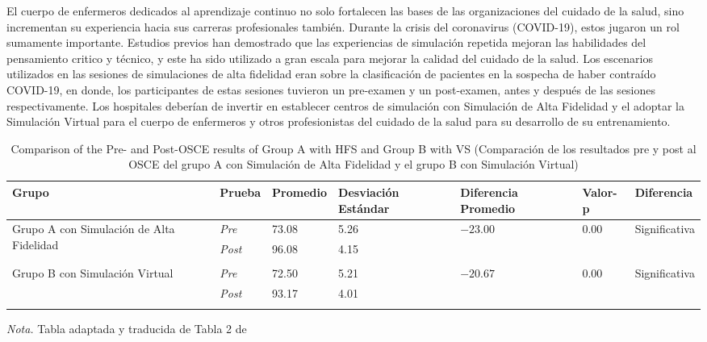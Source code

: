 El cuerpo de enfermeros dedicados al aprendizaje continuo no solo fortalecen las bases de las organizaciones del cuidado de la salud, sino incrementan su experiencia hacia sus carreras profesionales también. Durante la crisis del coronavirus (COVID-19), estos jugaron un rol sumamente importante. Estudios previos han demostrado que las experiencias de simulación repetida mejoran las habilidades del pensamiento critico y técnico, y este ha sido utilizado a gran escala para mejorar la calidad del cuidado de la salud. Los escenarios utilizados en las sesiones de simulaciones de alta fidelidad eran sobre la clasificación de pacientes en la sospecha de haber contraído COVID-19, en donde, los participantes de estas sesiones tuvieron un pre-examen y un post-examen, antes y después de las sesiones respectivamente. Los hospitales deberían de invertir en establecer centros de simulación con Simulación de Alta Fidelidad y el adoptar la Simulación Virtual para el cuerpo de enfermeros y otros profesionistas del cuidado de la salud para su desarrollo de su entrenamiento. \cite{GUERRERO2022100002}
\begin{table}[H]
   \caption{Comparison of the Pre- and Post-OSCE results of Group A with HFS and Group B with VS (Comparación de los resultados pre y post al OSCE del grupo A con Simulación de Alta Fidelidad y el grupo B con Simulación Virtual)}
   \label{tab:tabla-enfermeros}
   \begin{center}
      \begin{tabular}{ p{3cm} p{1cm} p{2cm} p{2cm} p{2cm} p{1cm} p{1cm} }
         \hline
         Grupo & Prueba & Promedio & Desviación Estándar & Diferencia Promedio & Valor-p & Diferencia \\
         \hline
         \multirow{2}{3cm}{Grupo A con Simulación de Alta Fidelidad} & \textit{Pre}  & 73.08 & 5.26 & $-23.00$ & 0.00 & Significativa \\
                                             & \textit{Post} & 96.08 & 4.15 & ~      & ~    & ~            \\
                                             \\
         \multirow{2}{3cm}{Grupo B con Simulación Virtual}  & \textit{Pre}  & 72.50 & 5.21 & $-20.67$ & 0.00 & Significativa \\
                                             & \textit{Post} & 93.17 & 4.01 \\
                                             \\
         \hline
      \end{tabular}
   \end{center}
   \textit{Nota.} Tabla adaptada y traducida de Tabla 2 de \cite{GUERRERO2022100002}
\end{table}
